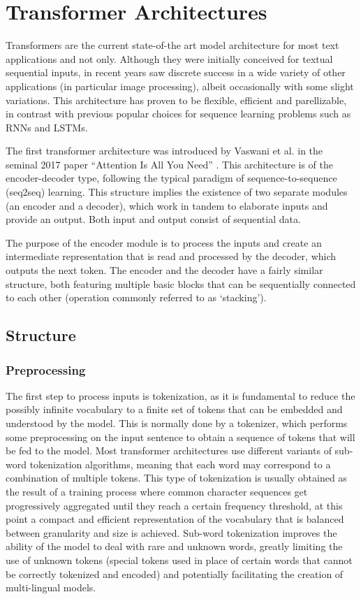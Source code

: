 \section{Transformer Architectures}

Transformers are the current state-of-the art model architecture for most text applications and not only.
Although they were initially conceived for textual sequential inputs, in recent years saw discrete success in a wide variety of other applications (in particular image processing), albeit occasionally with some slight variations.
This architecture has proven to be flexible, efficient and parellizable, in contrast with previous popular choices for sequence learning problems such as RNNs and LSTMs.

The first transformer architecture was introduced by Vaswani et al. in the seminal 2017 paper ``Attention Is All You Need'' \cite{vaswani2017}.
This architecture is of the encoder-decoder type, following the typical paradigm of sequence-to-sequence (seq2seq) learning.
This structure implies the existence of two separate modules (an encoder and a decoder), which work in tandem to elaborate inputs and provide an output.
Both input and output consist of sequential data.

The purpose of the encoder module is to process the inputs and create an intermediate representation that is read and processed by the decoder, which outputs the next token.
The encoder and the decoder have a fairly similar structure, both featuring multiple basic blocks that can be sequentially connected to each other (operation commonly referred to as `stacking').

\subsection{Structure}

\subsubsection*{Preprocessing}

The first step to process inputs is tokenization, as it is fundamental to reduce the possibly infinite vocabulary to a finite set of tokens that can be embedded and understood by the model.
This is normally done by a tokenizer, which performs some preprocessing on the input sentence to obtain a sequence of tokens that will be fed to the model.
Most transformer architectures use different variants of sub-word tokenization algorithms, meaning that each word may correspond to a combination of multiple tokens.
This type of tokenization is usually obtained as the result of a training process where common character sequences get progressively aggregated until they reach a certain frequency threshold, at this point a compact and efficient representation of the vocabulary that is balanced between granularity and size is achieved.
Sub-word tokenization improves the ability of the model to deal with rare and unknown words, greatly limiting the use of unknown tokens (special tokens used in place of certain words that cannot be correctly tokenized and encoded) and potentially facilitating the creation of multi-lingual models.

